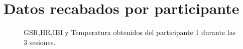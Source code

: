 \appendix{}
\chapter{Datos recabados por participante}\label{anex:gathereddata}
\begin{figure}[h]
        \centering
        \caption{GSR,HR,IBI y Temperatura obtenidos del participante 1 durante las 3 sesiones.}\label{fig:data_p1}
\end{figure}
